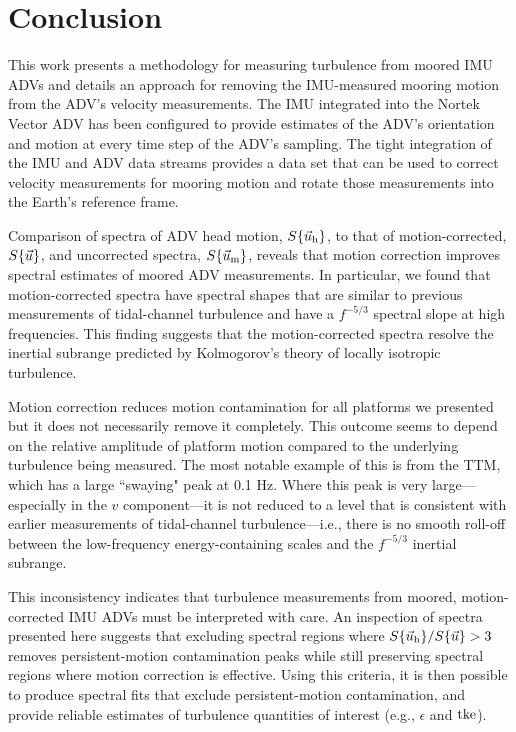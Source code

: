 
\section{Conclusion}
\label{sec:conclusion}
 
This work presents a methodology for measuring turbulence from moored IMU ADVs and details an approach for removing the IMU-measured mooring motion from the ADV's velocity measurements. The IMU integrated into the Nortek Vector ADV has been configured to provide estimates of the ADV's orientation and motion at every time step of the ADV's sampling. The tight integration of the IMU and ADV data streams provides a data set that can be used to correct velocity measurements for mooring motion and rotate those measurements into the Earth's reference frame. 

Comparison of spectra of ADV head motion, $S\{\vec{u}_\mathrm{h}\}$, to that of motion-corrected, $S\{\vec{u}\}$, and uncorrected spectra, $S\{\vec{u}_\mathrm{m}\}$, reveals that motion correction improves spectral estimates of moored ADV measurements. In particular, we found that motion-corrected spectra have spectral shapes that are similar to previous measurements of tidal-channel turbulence and have a $f^{-5/3}$ spectral slope at high frequencies. This finding suggests that the motion-corrected spectra resolve the inertial subrange predicted by Kolmogorov's theory of locally isotropic turbulence.

Motion correction reduces motion contamination for all platforms we presented but it does not necessarily remove it completely. This outcome seems to depend on the relative amplitude of platform motion compared to the underlying turbulence being measured. The most notable example of this is from the TTM, which has a large ``swaying" peak at 0.1 Hz. Where this peak is very large---especially in the $v$ component---it is not reduced to a level that is consistent with earlier measurements of tidal-channel turbulence---i.e., there is no smooth roll-off between the low-frequency energy-containing scales and the $f^{-5/3}$ inertial subrange.

This inconsistency indicates that turbulence measurements from moored, motion-corrected IMU ADVs must be interpreted with care. An inspection of spectra presented here suggests that excluding spectral regions where $S\{\vec{u}_\mathrm{h}\} / S\{\vec{u}\} > 3$ removes persistent-motion contamination peaks while still preserving spectral regions where motion correction is effective. Using this criteria, it is then possible to produce spectral fits that exclude persistent-motion contamination, and provide reliable estimates of turbulence quantities of interest (e.g., $\epsilon$ and $\mathrm{tke}$).

